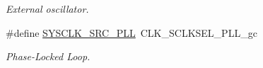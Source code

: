 \begin{DoxyCompactItemize}
\begin{DoxyCompactList}\small\item\em External oscillator. \end{DoxyCompactList}\item 
\hypertarget{group__sysclk__group_gae4e485c90dca4752f087c0975a9e3498}{\#define \hyperlink{group__sysclk__group_gae4e485c90dca4752f087c0975a9e3498}{S\-Y\-S\-C\-L\-K\-\_\-\-S\-R\-C\-\_\-\-P\-L\-L}~C\-L\-K\-\_\-\-S\-C\-L\-K\-S\-E\-L\-\_\-\-P\-L\-L\-\_\-gc}\label{group__sysclk__group_gae4e485c90dca4752f087c0975a9e3498}

\begin{DoxyCompactList}\small\item\em Phase-\/\-Locked Loop. \end{DoxyCompactList}\end{DoxyCompactItemize}
